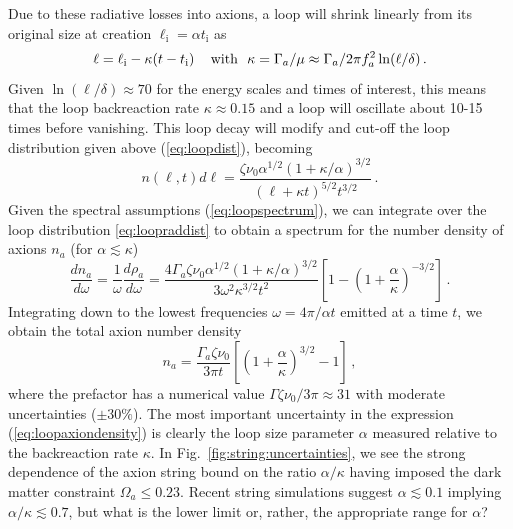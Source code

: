 \documentclass[preprint,nofootinbib]{revtex4}
\newcommand{\reffig}[1]{Fig.~\ref{#1}}
\begin{document}
Due to these radiative losses into axions, a loop will shrink linearly from its original size at creation $\ell_{\mathrm i} = \alpha t_{\mathrm i}$ as
\begin{equation}
\ell = \ell_{\mathrm i} - \kappa (t - t_{\mathrm i})\,\quad \hbox{with} ~~\kappa  = \Gamma_a / \mu \approx \Gamma_ a /2\pi f_a^2\ln(\ell/\delta)\,.
\end{equation}
Given $\ln(\ell/\delta)\approx 70$ for the energy scales and times of interest, this means that the loop backreaction rate $\kappa \approx 0.15$ and a loop will oscillate about 10-15 times before vanishing. This loop decay will modify and cut-off the loop distribution given above (\ref{eq:loopdist}), becoming 
\begin{equation}
n(\ell, t ) d\ell =\frac{ \zeta \nu_0\alpha ^{1/2} (1+\kappa/\alpha)^{3/2}}{(\ell+\kappa t)^{5/2}t^{3/2}}\,.\label{eq:loopraddist}
\end{equation}
Given  the spectral assumptions (\ref{eq:loopspectrum}), we can integrate over the loop distribution \ref{eq:loopraddist} to obtain a spectrum for the number density of axions $n_a$ (for $\alpha\lesssim \kappa$) \cite{Battye:1997jk}
\begin{equation}
\frac{dn_a}{d\omega} =\frac {1}{\omega} \frac{d\rho_a}{d\omega}  = \frac{ 4\Gamma_a\zeta \nu_0\alpha ^{1/2} (1+\kappa/\alpha)^{3/2}}{3\omega^2\kappa^{3/2}t^2} \left [ 1 - \left(1+\frac{\alpha}{\kappa}\right)^{-3/2}\right]\,.
\end{equation}
Integrating down to the lowest frequencies $\omega = 4\pi/\alpha t$ emitted at a time $t$, we obtain the total axion number density \cite{Battye:1997jk}
\begin{equation}
n_a=\frac{ \Gamma_a\zeta \nu_0 }{3\pi t} \left [  \left(1+\frac{\alpha}{\kappa}\right)^{3/2}-1\right]\,,\label{eq:loopaxiondensity}
\end{equation}
where the prefactor has a numerical value $\Gamma\zeta\nu_0/3\pi \approx 31$ with moderate uncertainties  ($\pm30\%$). The most important uncertainty in the expression (\ref{eq:loopaxiondensity}) is clearly the loop size parameter $\alpha$ measured relative to the backreaction rate $\kappa$. In \reffig{fig:string:uncertainties}, we see the strong dependence of the axion string bound on the ratio $\alpha/\kappa$ having imposed the dark matter constraint $\Omega_a \le 0.23$. Recent string simulations suggest $\alpha \lesssim 0.1$ implying $\alpha/\kappa \lesssim 0.7$, but what is the lower limit or, rather, the appropriate range for $\alpha$?
\end{document}
